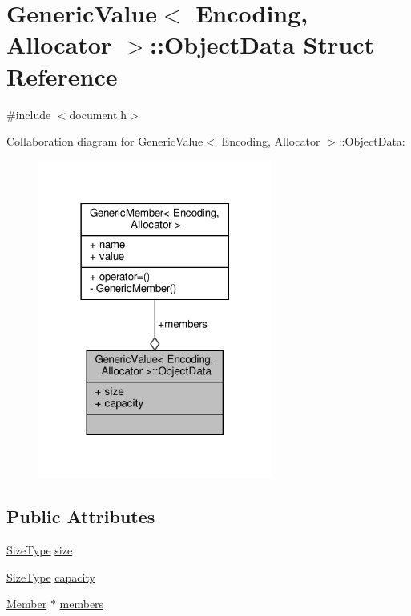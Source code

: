 \hypertarget{structGenericValue_1_1ObjectData}{}\section{Generic\+Value$<$ Encoding, Allocator $>$\+:\+:Object\+Data Struct Reference}
\label{structGenericValue_1_1ObjectData}


{\ttfamily \#include $<$document.\+h$>$}



Collaboration diagram for Generic\+Value$<$ Encoding, Allocator $>$\+:\+:Object\+Data\+:
\nopagebreak
\begin{figure}[H]
\begin{center}
\leavevmode
\includegraphics[width=218pt]{structGenericValue_1_1ObjectData__coll__graph}
\end{center}
\end{figure}
\subsection*{Public Attributes}
\begin{DoxyCompactItemize}
\item 
\hyperlink{rapidjson_8h_a5ed6e6e67250fadbd041127e6386dcb5}{Size\+Type} \hyperlink{structGenericValue_1_1ObjectData_a8aa09c430b245b9bb0745a1ab38201d5}{size}
\item 
\hyperlink{rapidjson_8h_a5ed6e6e67250fadbd041127e6386dcb5}{Size\+Type} \hyperlink{structGenericValue_1_1ObjectData_a22b8d8b01d52db71471f0d4c990cb93b}{capacity}
\item 
\hyperlink{classGenericValue_a7ccf27c44058b4c11c3efc6473afb886}{Member} $\ast$ \hyperlink{structGenericValue_1_1ObjectData_a108be865f16e4c028f2354b1474a1ec8}{members}
\end{DoxyCompactItemize}


